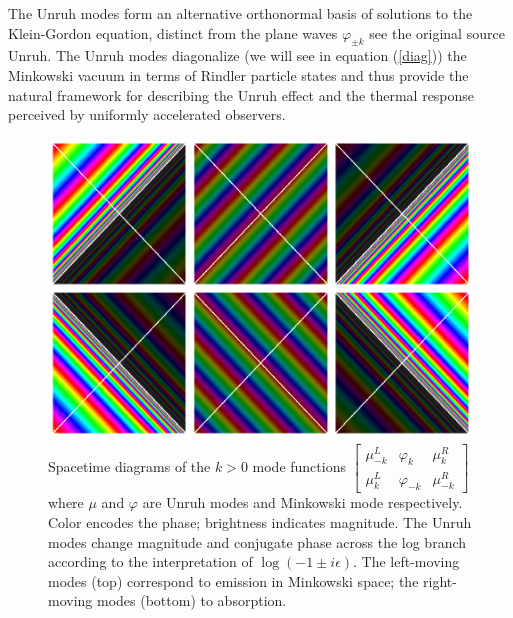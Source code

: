 \documentclass[12pt,a4paper]{article}
\begin{document}
The Unruh modes form an alternative orthonormal basis of solutions to the Klein-Gordon equation, distinct from the plane waves $\varphi_{\pm k}$ see the original source Unruh\cite{unruh1976notes}. The Unruh modes diagonalize (we will see in equation (\ref{diag})) the Minkowski vacuum in terms of Rindler particle states and thus provide the natural framework for describing the Unruh effect and the thermal response perceived by uniformly accelerated observers.

\begin{figure}[h]
\centering
\includegraphics[scale=0.3]{unruh_mode_rainbow.png}
\captionsetup{width=0.7\textwidth}
\caption{Spacetime diagrams of the $k>0$ mode functions $\left[\begin{array}{ccc} \mu^L_{-k} & \varphi_k & \mu^R_k \\ \mu^L_{k} & \varphi_{-k} & \mu^R_{-k} \end{array} \right]$ where $\mu$ and $\varphi$ are Unruh modes and Minkowski mode respectively. Color encodes the phase; brightness indicates magnitude. The Unruh modes change magnitude and conjugate phase across the log branch according to the interpretation of $\log(-1 \pm i\epsilon)$. The left-moving modes (top) correspond to emission in Minkowski space; the right-moving modes (bottom) to absorption.}
\label{unruh_rainbow}
\end{figure}
\end{document}
